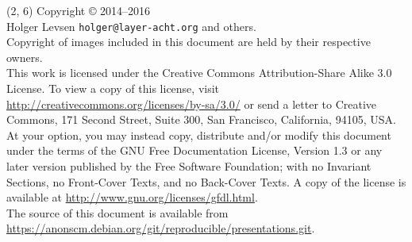 \documentclass[14pt]{beamer}
\begin{document}
\begin{frame}{}
\begin{textblock}{12}(2, 6)
    \tiny{
      Copyright \copyright{} 2014--2016 \\
         Holger Levsen \texttt{holger@layer-acht.org} and others.\\[3.0mm]
      Copyright of images included in this document are held by
      their respective owners.
      \\[3.0mm]
      This work is licensed under the \alert{Creative Commons
        Attribution-Share Alike 3.0} License.  To view a copy of this
      license, visit
      \url{http://creativecommons.org/licenses/by-sa/3.0/} or send a
      letter to Creative Commons, 171 Second Street, Suite 300, San
      Francisco, California, 94105, USA.
      \\[2.0mm]
      At your option, you may instead copy, distribute and/or modify
      this document under the terms of the \alert{GNU Free Documentation
        License, Version 1.3 or any later version} published by the Free
      Software Foundation; with no Invariant Sections, no Front-Cover
      Texts, and no Back-Cover Texts.  A copy of the license is
      available at \url{http://www.gnu.org/licenses/gfdl.html}.
      \\[2.0mm]
      The source of this document is available from
      \url{https://anonscm.debian.org/git/reproducible/presentations.git}.
    }
  \end{textblock}
\end{frame}
\end{document}
